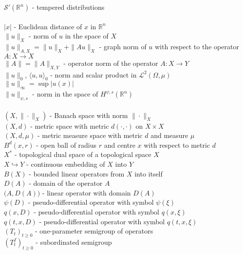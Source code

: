 \documentclass[a4paper, 12pt]{report}
\theoremstyle{cor}
\theoremstyle{remark}
\theoremstyle{definition}
\begin{document}
$\mathcal{S}'(\mathbb{R}^n)$ - tempered distributions\\
\\
$|x|$ - Euclidean distance of $x$ in $\mathbb{R}^n$\\
$\|u\|_X$ - norm of $u$ in the space of $X$\\
$\|u\|_{A, X} = \|u\|_X + \|Au\|_X$ - graph norm of $u$ with respect to the operator $A : X \to X$\\
$\|A\| = \|A\|_{X, Y}$ - operator norm of the operator $A : X \to Y$\\
$\|u\|_0$, $\langle u, u\rangle_0$ - norm and scalar product in $\mathcal{L}^2(\Omega, \mu)$\\
$\|u\|_\infty = \sup|u(x)|$\\
$\|u\|_{\psi, s}$ - norm in the space of $H^{\psi, s}(\mathbb{R}^n)$\\
\\
$(X, \|\cdot\|_X)$ - Banach space with norm $\|\cdot\|_X$\\
$(X, d)$ - metric space with metric $d(\cdot, \cdot)$ on $X \times X$\\
$(X, d, \mu)$ - metric measure space with metric $d$ and measure $\mu$\\
$B^d(x, r)$ - open ball of radius $r$ and centre $x$ with respect to metric $d$\\
$X^\ast$ - topological dual space of a topological space $X$\\
$X \hookrightarrow Y$ - continuous embedding of $X$ into $Y$\\
$B(X)$ - bounded linear operators from $X$ into itself\\
$D(A)$ - domain of the operator $A$\\
$\big(A, D(A)\big)$ - linear operator with domain $D(A)$\\
$\psi(D)$ - pseudo-differential operator with symbol $\psi(\xi)$\\
$q(x, D)$ - pseudo-differential operator with symbol $q(x, \xi)$\\
$q(t, x, D)$ - pseudo-differential operator with symbol $q(t, x, \xi)$\\
$(T_t)_{t \ge 0}$ - one-parameter semigroup of operators\\
$(T_t^f)_{t \ge 0}$ - subordinated semigroup
\end{document}
